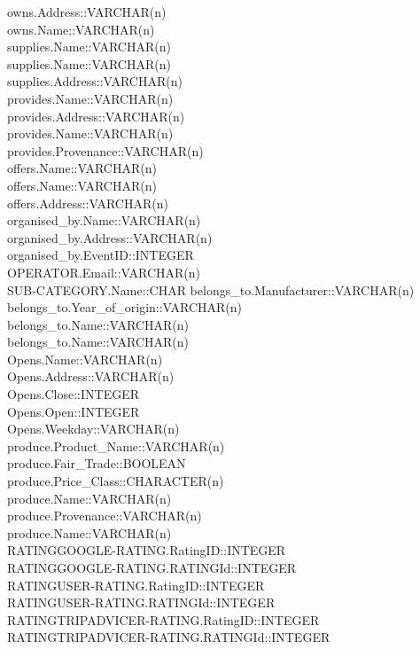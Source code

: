 owns.Address::VARCHAR(n)\\
owns.Name::VARCHAR(n)\\
supplies.Name::VARCHAR(n)\\
supplies.Name::VARCHAR(n)\\
supplies.Address::VARCHAR(n)\\
provides.Name::VARCHAR(n)\\
provides.Address::VARCHAR(n)\\
provides.Name::VARCHAR(n)\\
provides.Provenance::VARCHAR(n)\\
offers.Name::VARCHAR(n)\\
offers.Name::VARCHAR(n)\\
offers.Address::VARCHAR(n)\\
organised\_by.Name::VARCHAR(n)\\
organised\_by.Address::VARCHAR(n)\\
organised\_by.EventID::INTEGER\\
OPERATOR.Email::VARCHAR(n)\\
SUB-CATEGORY.Name::CHAR
belongs\_to.Manufacturer::VARCHAR(n)\\
belongs\_to.Year\_of\_origin::VARCHAR(n)\\
belongs\_to.Name::VARCHAR(n)\\
belongs\_to.Name::VARCHAR(n)\\
Opens.Name::VARCHAR(n)\\
Opens.Address::VARCHAR(n)\\
Opens.Close::INTEGER\\
Opens.Open::INTEGER\\
Opens.Weekday::VARCHAR(n)\\
produce.Product\_Name::VARCHAR(n)\\
produce.Fair\_Trade::BOOLEAN\\
produce.Price\_Class::CHARACTER(n)\\
produce.Name::VARCHAR(n)\\
produce.Provenance::VARCHAR(n)\\
produce.Name::VARCHAR(n)\\
RATINGGOOGLE-RATING.RatingID::INTEGER\\
RATINGGOOGLE-RATING.RATINGId::INTEGER\\
RATINGUSER-RATING.RatingID::INTEGER\\
RATINGUSER-RATING.RATINGId::INTEGER\\
RATINGTRIPADVICER-RATING.RatingID::INTEGER\\
RATINGTRIPADVICER-RATING.RATINGId::INTEGER\\
